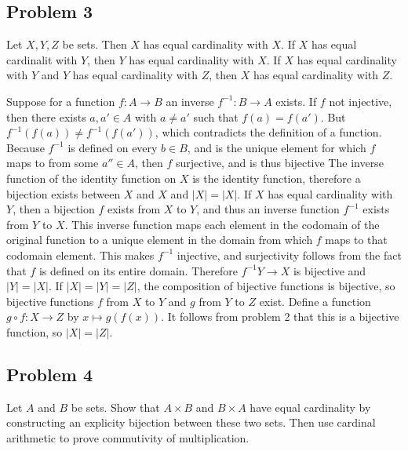 \documentclass{article}
\begin{document}
\subsection*{Problem 3}
Let \(X,Y,Z\) be sets. Then \(X\) has equal cardinality with \(X\). If \(X\) has equal cardinalit with \(Y\), then \(Y\) has equal cardinality with \(X\). If \(X\) has equal cardinality with \(Y\) and \(Y\) has equal cardinality with \(Z\), then \(X\) has equal cardinality with \(Z\).
\medbreak
\begin{IEEEproof}
	Suppose for a function \(f:A\rightarrow B\) an inverse \(f^{-1}:B\rightarrow A\) exists. If \(f\) not injective, then there exists \(a,a'\in A\) with \(a\neq a'\) such that \(f(a)=f(a')\). But \(f^{-1}(f(a))\neq f^{-1}(f(a'))\), which contradicts the definition of a function. Because \(f^{-1}\) is defined on every \(b\in B\), and is the unique element for which \(f\) maps to from some \(a''\in A\), then \(f\) surjective, and is thus bijective
	\smallbreak
	The inverse function of the identity function on \(X\) is the identity function, therefore a bijection exists between \(X\) and \(X\) and \(\lvert X\rvert=\lvert X\rvert\). If \(X\) has equal cardinality with \(Y\), then a bijection \(f\) exists from \(X\) to \(Y\), and thus an inverse function \(f^{-1}\) exists from \(Y\) to \(X\). This inverse function maps each element in the codomain of the original function to a unique element in the domain from which \(f\) maps to that codomain element. This makes \(f^{-1}\) injective, and surjectivity follows from the fact that \(f\) is defined on its entire domain. Therefore \(f^{-1}Y\rightarrow X\) is bijective and \(\lvert Y\rvert=\lvert X\rvert\). If \(\lvert X\rvert=\lvert Y\rvert=\lvert Z\rvert\), the composition of bijective functions is bijective, so bijective functions \(f\) from \(X\) to \(Y\) and \(g\) from \(Y\) to \(Z\) exist. Define a function \(g\circ f:X\rightarrow Z\) by \(x\mapsto g(f(x))\). It follows from problem 2 that this is a bijective function, so \(\lvert X\rvert=\lvert Z\rvert\).
\end{IEEEproof}
\subsection*{Problem 4}
Let \(A\) and \(B\) be sets. Show that \(A\times B\) and \(B\times A\) have equal cardinality by constructing an explicity bijection between these two sets. Then use cardinal arithmetic to prove commutivity of multiplication.
\medbreak
\begin{IEEEproof}
\end{IEEEproof}
\end{document}
